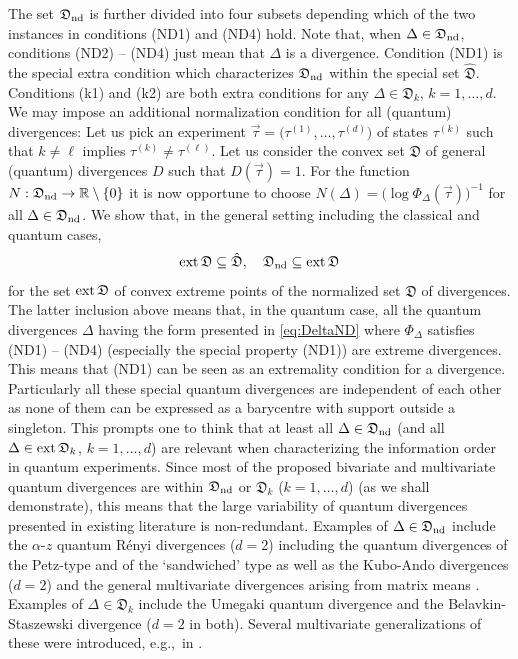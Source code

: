 \documentclass[12pt,a4paper,reqno]{amsart}
\theoremstyle{definition}
\newcommand{\mf}[1]{\mathfrak{#1}}
\newcommand{\R}{\mathbb R}
\begin{document}
The set $\mf D_{\rm nd}$ is further divided into four subsets depending which of the two instances in conditions (ND1) and (ND4) hold. Note that, when $\Delta\in\mf D_{\rm nd}$, conditions (ND2) -- (ND4) just mean that $\Delta$ is a divergence. Condition (ND1) is the special extra condition which characterizes $\mf D_{\rm nd}$ within the special set $\hat{\mf D}$. Conditions (k1) and (k2) are both extra conditions for any $\Delta\in\mf D_k$, $k=1,\ldots,d$. We may impose an additional normalization condition for all (quantum) divergences: Let us pick an experiment $\vec{\tau}=\big(\tau^{(1)},\ldots,\tau^{(d)}\big)$ of states $\tau^{(k)}$ such that $k\neq\ell$ implies $\tau^{(k)}\neq\tau^{(\ell)}$. Let us consider the convex set $\mf D$ of general (quantum) divergences $D$ such that $D(\vec{\tau})=1$. For the function $N:\mf D_{\rm nd}\to\R\setminus\{0\}$ it is now opportune to choose $N(\Delta)=\big(\log{\Phi_\Delta(\vec{\tau})}\big)^{-1}$ for all $\Delta\in\mf D_{\rm nd}$. We show that, in the general setting including the classical and quantum cases,
\begin{equation}\label{eq:extresult}
{\rm ext}\,\mf D\subseteq\hat{\mf D},\quad \mf D_{\rm nd}\subseteq{\rm ext}\,\mf D
\end{equation}
for the set ${\rm ext}\,\mf D$ of convex extreme points of the normalized set $\mf D$ of divergences. The latter inclusion above means that, in the quantum case, all the quantum divergences $\Delta$ having the form presented in \eqref{eq:DeltaND} where $\Phi_\Delta$ satisfies (ND1) -- (ND4) (especially the special property (ND1)) are extreme divergences. This means that (ND1) can be seen as an extremality condition for a divergence. Particularly all these special quantum divergences are independent of each other as none of them can be expressed as a barycentre with support outside a singleton. This prompts one to think that at least all $\Delta\in\mf D_{\rm nd}$ (and all $\Delta\in{\rm ext}\,\mf D_k$, $k=1,\ldots,d$) are relevant when characterizing the information order in quantum experiments. Since most of the proposed bivariate and multivariate quantum divergences are within $\mf D_{\rm nd}$ or $\mf D_k$ ($k=1,\ldots,d$) (as we shall demonstrate), this means that the large variability of quantum divergences presented in existing literature is non-redundant. Examples of $\Delta\in\mf D_{\rm nd}$ include the $\alpha$-$z$ quantum R\'{e}nyi divergences ($d=2$) \cite{Audenaert_Datta_2015,Jaksic2012} including the quantum divergences of the Petz-type \cite{Petz_85,Petz_1986} and of the `sandwiched' type \cite{Muller-Lennert_et_al_2013} as well as the Kubo-Ando divergences ($d=2$) \cite{Kubo_Ando_79} and the general multivariate divergences arising from matrix means \cite{Bhatia_Karandikar_2012}. Examples of $\Delta\in\mf D_k$ include the Umegaki quantum divergence and the Belavkin-Staszewski divergence \cite{Belavkin_Staszewski_82} ($d=2$ in both). Several multivariate generalizations of these were introduced, e.g.,\ in \cite{BuVra2021,mosonyi2024geometric}.
\end{document}
